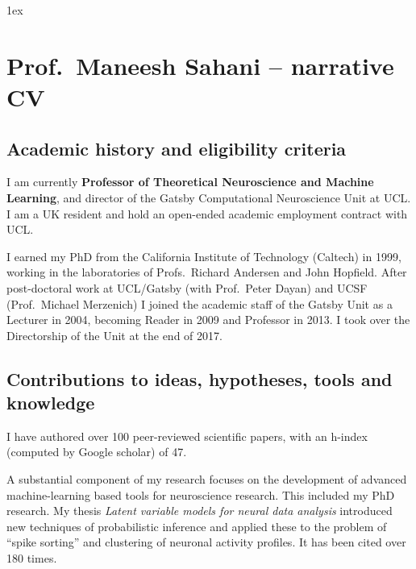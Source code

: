 {
  \parindent 0pt
  \parskip 1ex

\section{Prof.\ Maneesh Sahani -- narrative CV}



\subsection{Academic history and eligibility criteria}

I am currently \textbf{Professor of Theoretical Neuroscience and Machine Learning}, and
director of the Gatsby Computational Neuroscience Unit at UCL.
%
I am a UK resident and hold an open-ended academic employment contract
with UCL.

I earned my PhD from the California Institute of Technology (Caltech)
in 1999, working in the laboratories of Profs.\ Richard Andersen and
John Hopfield.
%
After post-doctoral work at UCL/Gatsby (with Prof.\ Peter Dayan) and
UCSF (Prof.\ Michael Merzenich) I joined the academic staff of the
Gatsby Unit as a Lecturer in 2004, becoming Reader in 2009 and
Professor in 2013.
%
I took over the Directorship of the Unit at the end of 2017.

% 

\subsection{Contributions to ideas, hypotheses, tools and knowledge}

I have authored over 100 peer-reviewed scientific papers, with an
h-index (computed by Google scholar) of 47.

A substantial component of my research focuses on the development of
advanced machine-learning based tools for neuroscience research.
%
This included my PhD research.  My thesis \textit{Latent variable
  models for neural data analysis} introduced new techniques of
probabilistic inference and applied these to the problem of ``spike
sorting'' and clustering of neuronal activity profiles.  It has been cited
over 180 times.


}
